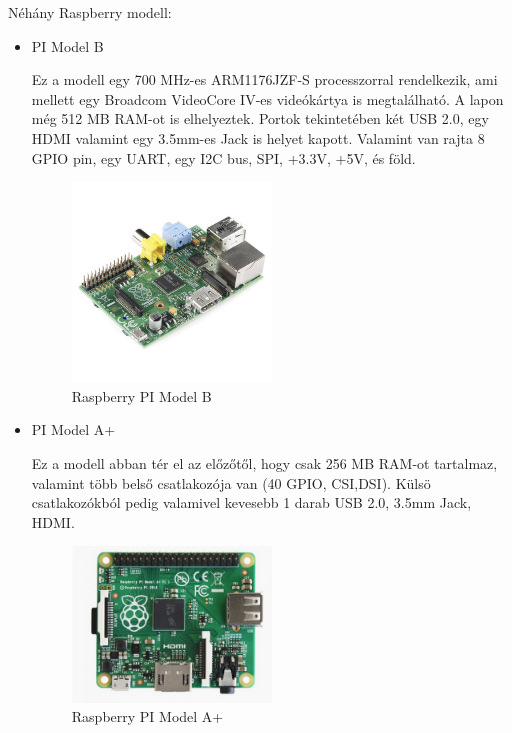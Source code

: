 \documentclass[a4paper,12pt,oneside]{report}
\begin{document}
Néhány Raspberry modell:
\begin{itemize}

	\item{PI Model B}

	Ez a modell egy 700 MHz-es ARM1176JZF-S processzorral rendelkezik, ami mellett egy Broadcom VideoCore IV-es videókártya is
	megtalálható. A lapon még 512 MB RAM-ot is elhelyeztek. Portok tekintetében két USB 2.0, egy HDMI valamint egy 3.5mm-es Jack
	is helyet kapott. Valamint van rajta 8 GPIO pin, egy UART, egy I2C bus, SPI, +3.3V, +5V, és föld.
	\begin{figure}[htbp]
		\centering
		\includegraphics[width=0.5\textwidth]{fig/modelb.png}
		\caption{Raspberry PI Model B}
		\label{fig-modelb}
	\end{figure}
		
	\item{PI Model A+}

	Ez a modell abban tér el az előzőtől, hogy csak 256 MB RAM-ot tartalmaz, valamint több belső csatlakozója van (40 GPIO, CSI,DSI).
	Külsö csatlakozókból pedig valamivel kevesebb 1 darab USB 2.0, 3.5mm Jack, HDMI.
	\begin{figure}[htbp]
		\centering
		\includegraphics[width=0.5\textwidth]{fig/aplusz.png}
		\caption{Raspberry PI Model A+}
		\label{fig-aplusz}
	\end{figure}
		

\end{itemize}
\end{document}
